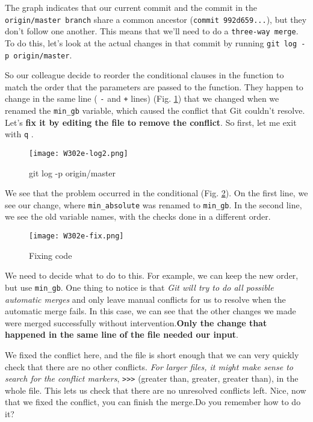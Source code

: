	The graph indicates that our current commit and the commit in the \verb|origin/master branch| share a common ancestor (\verb|commit 992d659...|), but they don't follow one another.
	This means that we'll need to do a \verb|three-way merge|. To do this, let's look at the actual changes in that commit by running \verb|git log -p origin/master|.
	
	So our colleague decide to reorder the conditional clauses in the function to match the order that the parameters are passed to the function. 
	They happen to change in the same line ( \verb|-| and \verb|+| lines) (Fig. \ref{W302e-log2}) that we changed when we renamed the \verb|min_gb| variable, which caused the conflict that Git couldn't resolve. Let's \textbf{fix it by editing the file to remove the conflict}. So first, let me exit with \verb|q| .
	
	\begin{figure} 
		\caption{git log -p origin/master}
		\centering
		\texttt{[image: W302e-log2.png]}
		\label{W302e-log2}
	\end{figure}
	
	We see that the problem occurred in the conditional (Fig. \ref{W302e-fix}). On the first line, we see our change, where \verb|min_absolute| was renamed to \verb|min_gb|. In the second line, we see the old variable names, with the checks done in a different order.
	
	\begin{figure} 
		\caption{Fixing code}
		\centering
		\texttt{[image: W302e-fix.png]}
		\label{W302e-fix}
	\end{figure}
	
	We need to decide what to do to this. For example, we can keep the new order, but use \verb|min_gb|. One thing to notice is that \textit{Git will try to do all possible automatic merges} and only leave manual conflicts for us to resolve when the automatic merge fails.
	In this case, we can see that the other changes we made were merged successfully without intervention.\textbf{Only the change that happened in the same line of the file needed our input}. 
	
	We fixed the conflict here, and the file is short enough that we can very quickly check that there are no other conflicts.\textit{ For larger files, it might make sense to search for the conflict markers}, \verb|>>>| (greater than, greater, greater than), in the whole file. This lets us check that there are no unresolved conflicts left. Nice, now that we fixed the conflict, you can finish the merge.Do you remember how to do it?
	
